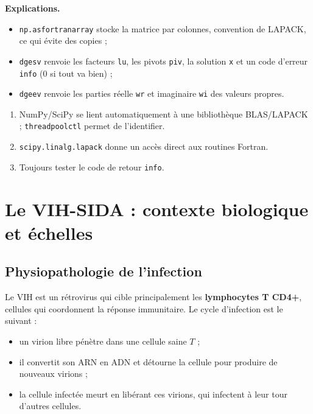 \documentclass[11pt,a4paper]{report}
\theoremstyle{plain}
\theoremstyle{definition}
\theoremstyle{remark}
\begin{document}
\noindent\textbf{Explications.}
\begin{itemize}
    \item \texttt{np.asfortranarray} stocke la matrice par colonnes, convention de LAPACK, ce qui évite des copies ;
    \item \texttt{dgesv} renvoie les facteurs \texttt{lu}, les pivots \texttt{piv}, la solution \texttt{x} et un code d'erreur \texttt{info} ($0$ si tout va bien) ;
    \item \texttt{dgeev} renvoie les parties réelle \texttt{wr} et imaginaire \texttt{wi} des valeurs propres.
\end{itemize}

\begin{encadreresume}
\begin{enumerate}
    \item NumPy/SciPy se lient automatiquement à une bibliothèque BLAS/LAPACK ; \texttt{threadpoolctl} permet de l'identifier.
    \item \texttt{scipy.linalg.lapack} donne un accès direct aux routines Fortran.
    \item Toujours tester le code de retour \texttt{info}.
\end{enumerate}
\end{encadreresume}

\chapter{Le VIH-SIDA : contexte biologique et échelles}

\section{Physiopathologie de l'infection}

Le VIH est un rétrovirus qui cible principalement les \textbf{lymphocytes T CD4+}, cellules qui coordonnent la réponse immunitaire. Le cycle d'infection est le suivant :
\begin{itemize}
    \item un virion libre pénètre dans une cellule saine $T$ ;
    \item il convertit son ARN en ADN et détourne la cellule pour produire de nouveaux virions ;
    \item la cellule infectée meurt en libérant ces virions, qui infectent à leur tour d'autres cellules.
\end{itemize}
\end{document}
